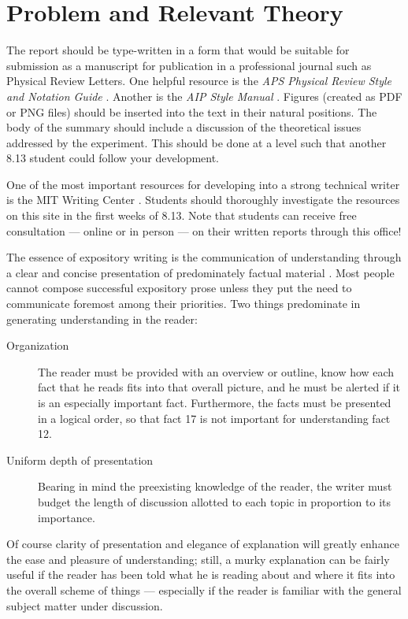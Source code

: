 \section{Problem and Relevant Theory}

The report should be type-written in a form that would be suitable
for submission as a manuscript for publication in a professional
journal such as Physical Review Letters. One helpful resource is the 
\textit{APS Physical Review Style and Notation Guide} \cite{aps2011}. Another is the \textit{AIP Style Manual} \cite{aip1990}. Figures (created
as PDF or PNG files) should be inserted into the text in their natural
positions. The body of the summary should include a discussion of
the theoretical issues addressed by the experiment. This should be
done at a level such that another 8.13 student could follow your
development.

One of the most important resources for developing into a strong
technical writer is the MIT Writing Center \cite{owc}.
Students should thoroughly investigate the resources on this site 
in the first weeks of 8.13.  Note that students can receive free
consultation ---  online or in person --- on their written reports
through this office!

 The essence of expository writing is the communication of understanding
through a clear and concise presentation of predominately factual
material \cite{mayfield1998,pritchard1990}. Most people cannot
compose successful expository prose unless they put the need to
communicate foremost among their priorities. Two things predominate
in generating understanding in the reader:
\begin{description}
\item[Organization] The reader must be provided with an overview or
outline, know how each fact that he reads fits into that overall
picture, and he must be alerted if it is an especially important
fact. Furthermore, the facts must be presented in a logical order, 
so that fact 17 is not important for understanding fact 12.
\item[Uniform depth of presentation] Bearing in mind the 
preexisting knowledge of the reader, the writer must budget the 
length of discussion allotted to each topic in proportion to its 
importance.
\end{description}
Of course clarity of presentation and elegance of explanation will
greatly enhance the ease and pleasure of understanding; still, a
murky explanation can be fairly useful if the reader has been told
what he is reading about and where it fits into the overall scheme
of things --- especially if the reader is familiar with the general
subject matter under discussion.


